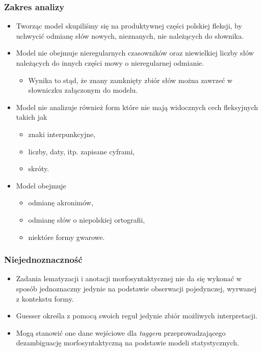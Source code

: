 \documentclass{beamer}
\begin{document}
\begin{frame}
\frametitle{Zakres analizy}
\begin{itemize}
\item Tworząc model skupiliśmy się na produktywnej części polskiej fleksji,
by uchwycić odmianę słów nowych, nieznanych, nie należących do słownika.
\item Model nie obejmuje nieregularnych czasowników oraz niewielkiej liczby słów 
należących do innych części mowy o nieregularnej odmianie.
\begin{itemize}
\item Wynika to stąd, że znany zamknięty zbiór słów można 
zawrzeć w słowniczku załączonym do modelu. 
\end{itemize}
\item Model nie analizuje również form które nie mają widocznych cech fleksyjnych
takich jak 
\begin{itemize}
\item znaki interpunkcyjne,
\item liczby, daty, itp.  zapisane cyframi,
\item skróty.
\end{itemize}
\item Model obejmuje 
\begin{itemize}
\item odmianę akronimów,
\item odmianę słów o niepolskiej ortografii,
\item niektóre formy gwarowe.
\end{itemize}
\end{itemize}
\end{frame}

\begin{frame}
\frametitle{Niejednoznaczność}
\begin{itemize}
\item Zadania lematyzacji i anotacji morfosyntaktycznej 
nie da się wykonać w sposób jednoznaczny jedynie na podstawie 
obserwacji pojedynczej, wyrwanej z kontekstu formy.
\item Guesser określa z pomocą swoich reguł jedynie zbiór możliwych interpretacji.
\item Mogą stanowić one dane wejściowe dla {\it taggera}
przeprowadzającego dezambiguację morfosyntaktyczną na podstawie modeli statystycznych.
\end{itemize}
\end{frame}
\end{document}
